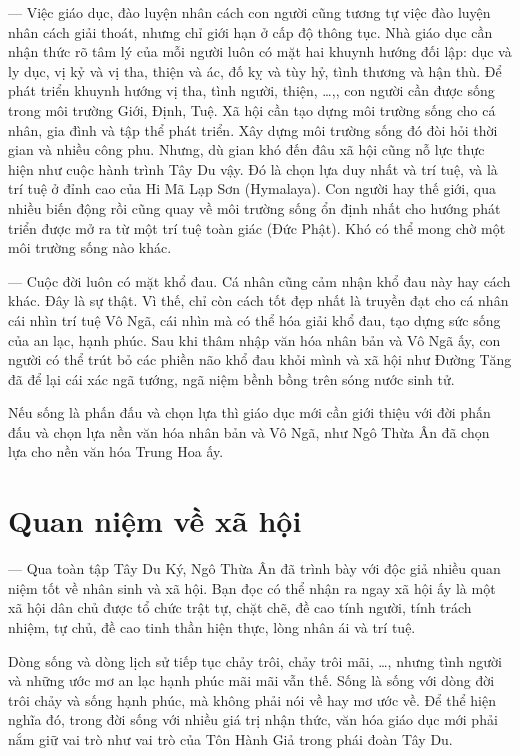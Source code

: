 — Việc giáo dục, đào luyện nhân cách con người cũng tương tự việc đào luyện nhân cách giải thoát, nhưng chỉ giới hạn ở cấp độ thông tục. Nhà giáo dục cần nhận thức rõ tâm lý của mỗi người luôn có mặt hai khuynh hướng đối lập: dục và ly dục, vị kỷ và vị tha, thiện và ác, đố kỵ và tùy hỷ, tình thương và hận thù. Để phát triển khuynh hướng vị tha, tình người, thiện, \ldots,, con người cần được sống trong môi trường Giới, Định, Tuệ. Xã hội cần tạo dựng môi trường sống cho cá nhân, gia đình và tập thể phát triển. Xây dựng môi trường sống đó đòi hỏi thời gian và nhiều công phu. Nhưng, dù gian khó đến đâu xã hội cũng nỗ lực thực hiện như cuộc hành trình Tây Du vậy. Đó là chọn lựa duy nhất và trí tuệ, và là trí tuệ ở đỉnh cao của Hi Mã Lạp Sơn (Hymalaya). Con người hay thế giới, qua nhiều biến động rồi cũng quay về môi trường sống ổn định nhất cho hướng phát triển được mở ra từ một trí tuệ toàn giác (Đức Phật). Khó có thể mong chờ một môi trường sống nào khác.

— Cuộc đời luôn có mặt khổ đau. Cá nhân cũng cảm nhận khổ đau này hay cách khác. Đây là sự thật. Vì thế, chỉ còn cách tốt đẹp nhất là truyền đạt cho cá nhân cái nhìn trí tuệ Vô Ngã, cái nhìn mà có thể hóa giải khổ đau, tạo dựng sức sống của an lạc, hạnh phúc. Sau khi thâm nhập văn hóa nhân bản và Vô Ngã ấy, con người có thể trút bỏ các phiền não khổ đau khỏi mình và xã hội như Đường Tăng đã để lại cái xác ngã tướng, ngã niệm bềnh bồng trên sóng nước sinh tử.

Nếu sống là phấn đấu và chọn lựa thì giáo dục mới cần giới thiệu với đời phấn đấu và chọn lựa nền văn hóa nhân bản và Vô Ngã, như Ngô Thừa Ân đã chọn lựa cho nền văn hóa Trung Hoa ấy.

\section{Quan niệm về xã hội} %
\label{sec:98_99_100_xa_hoi}

— Qua toàn tập Tây Du Ký, Ngô Thừa Ân đã trình bày với độc giả nhiều quan niệm tốt về nhân sinh và xã hội. Bạn đọc có thể nhận ra ngay xã hội ấy là một xã hội dân chủ được tổ chức trật tự, chặt chẽ, đề cao tính người, tính trách nhiệm, tự chủ, đề cao tinh thần hiện thực, lòng nhân ái và trí tuệ.

Dòng sống và dòng lịch sử tiếp tục chảy trôi, chảy trôi mãi, \ldots, nhưng tình người và những ước mơ an lạc hạnh phúc mãi mãi vẫn thế. Sống là sống với dòng đời trôi chảy và sống hạnh phúc, mà không phải nói về hay mơ ước về. Để thể hiện nghĩa  đó, trong đời sống với nhiều giá trị nhận thức, văn hóa giáo dục mới phải nắm giữ vai trò như vai trò của Tôn Hành Giả trong phái đoàn Tây Du.
